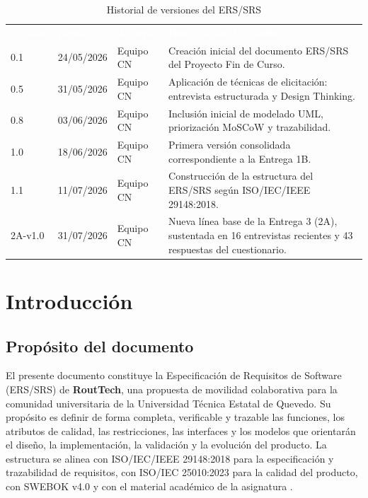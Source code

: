\documentclass[12pt,a4paper]{article}
\begin{document}
\begin{table}[H]
\centering
\caption{Historial de versiones del ERS/SRS}
\label{tab:historial-versiones}
\scriptsize
{}
\begin{tabularx}{\textwidth}{C{1.15cm} C{1.55cm} C{2.25cm} Y}
\textcolor{white}{\textbf{Versión}} &
\textcolor{white}{\textbf{Fecha}} &
\textcolor{white}{\textbf{Autoría}} &
\textcolor{white}{\textbf{Descripción del cambio}}\\
0.1 & 24/05/2026 & Equipo CN & Creación inicial del documento ERS/SRS del Proyecto Fin de Curso.\\
0.5 & 31/05/2026 & Equipo CN & Aplicación de técnicas de elicitación: entrevista estructurada y Design Thinking.\\
0.8 & 03/06/2026 & Equipo CN & Inclusión inicial de modelado UML, priorización MoSCoW y trazabilidad.\\
1.0 & 18/06/2026 & Equipo CN & Primera versión consolidada correspondiente a la Entrega 1B.\\
1.1 & 11/07/2026 & Equipo CN & Construcción de la estructura del ERS/SRS según ISO/IEC/IEEE 29148:2018.\\
2A-v1.0 & 31/07/2026 & Equipo CN & Nueva línea base de la Entrega 3 (2A), sustentada en 16 entrevistas recientes y 43 respuestas del cuestionario.\\
\end{tabularx}
\end{table}

\clearpage
\tableofcontents
\clearpage
\listoftables
\clearpage
\listoffigures
\clearpage

\section{Introducción}

\subsection{Propósito del documento}

El presente documento constituye la Especificación de Requisitos de Software (ERS/SRS) de \textbf{RoutTech}, una propuesta de movilidad colaborativa para la comunidad universitaria de la Universidad Técnica Estatal de Quevedo. Su propósito es definir de forma completa, verificable y trazable las funciones, los atributos de calidad, las restricciones, las interfaces y los modelos que orientarán el diseño, la implementación, la validación y la evolución del producto. La estructura se alinea con ISO/IEC/IEEE 29148:2018 para la especificación y trazabilidad de requisitos, con ISO/IEC 25010:2023 para la calidad del producto, con SWEBOK v4.0 y con el material académico de la asignatura \cite{iso29148,iso25010,swebok2024,uteq2026}.
\end{document}

